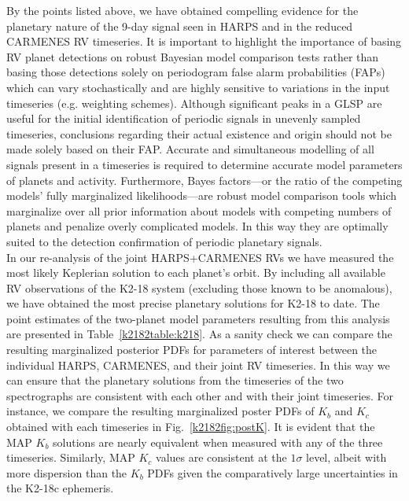 By the points listed above, we have obtained compelling evidence for the planetary nature of the 9-day signal seen in HARPS and
in the reduced CARMENES RV timeseries. It is important to highlight the importance of basing RV planet
detections on robust Bayesian model comparison tests rather than basing those detections
solely on  periodogram false alarm probabilities (FAPs) which can vary stochastically and are highly sensitive to variations
in the input timeseries (e.g. weighting schemes). Although significant peaks in a GLSP are useful for the initial
identification of periodic signals in unevenly sampled timeseries, conclusions regarding their actual existence and origin
should not be made solely based on their FAP. Accurate and simultaneous modelling of all signals present in a
timeseries is required to determine accurate model parameters of planets and activity. Furthermore,
Bayes factors---or the ratio of the competing models' fully
marginalized likelihoods---are robust model comparison tools which marginalize over all prior information about
models with competing numbers of planets and penalize overly complicated models. In this way they are optimally
suited to the detection confirmation of periodic planetary signals. \\

In our re-analysis of the joint HARPS+CARMENES RVs we have measured the most likely Keplerian solution to each planet's
orbit. By including all available RV observations of the K2-18 system (excluding those  known to be anomalous),
we have obtained the most precise planetary solutions for K2-18 to date.
The point estimates of the two-planet model parameters resulting
from this analysis are presented in Table~\ref{k2182table:k218}. As a sanity check we can compare the resulting marginalized
posterior PDFs for parameters of interest between the individual HARPS, CARMENES, and their joint RV timeseries. In this way
we can ensure that the planetary solutions from the timeseries of the two spectrographs  are consistent with each other 
and with their joint timeseries. For instance, we compare the resulting marginalized poster PDFs of $K_b$ and
$K_c$ obtained with each timeseries in Fig.~\ref{k2182fig:postK}. It is evident that the MAP $K_b$ solutions are nearly
equivalent when measured with any of the three timeseries. Similarly, MAP $K_c$ values are consistent at the $1\sigma$
level, albeit with more dispersion than the $K_b$ PDFs given the comparatively large uncertainties in the K2-18c
ephemeris.

